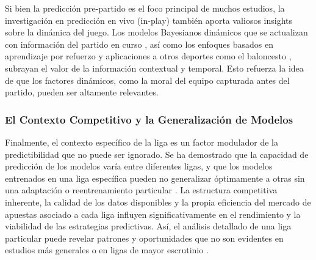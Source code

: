 Si bien la predicción pre-partido es el foco principal de muchos estudios, la investigación en predicción en vivo (in-play) también aporta valiosos insights sobre la dinámica del juego.
Los modelos Bayesianos dinámicos que se actualizan con información del partido en curso \cite{Zou2020BayesianInPlay}, así como los enfoques basados en aprendizaje por refuerzo \cite{Rahimian2024InGameRL} y aplicaciones a otros deportes como el baloncesto \cite{Song2020RealTimeNBAPredictions}, subrayan el valor de la información contextual y temporal. Esto refuerza la idea de que los factores dinámicos, como la moral del equipo capturada antes del partido, pueden ser altamente relevantes. \\


\subsubsection{El Contexto Competitivo y la Generalización de Modelos}

Finalmente, el contexto específico de la liga es un factor modulador de la predictibilidad que no puede ser ignorado.
Se ha demostrado que la capacidad de predicción de los modelos varía entre diferentes ligas, y que los modelos entrenados en una liga específica pueden no generalizar óptimamente a otras sin una adaptación o reentrenamiento particular \cite{Malamatinos2022GreekLeague}.
La estructura competitiva inherente, la calidad de los datos disponibles y la propia eficiencia del mercado de apuestas asociado a cada liga influyen significativamente en el rendimiento y la viabilidad de las estrategias predictivas. Así, el análisis detallado de una liga particular puede revelar patrones y oportunidades que no son evidentes en estudios más generales o en ligas de mayor escrutinio \cite{Beretta2023OptimalAlgorithmTournaments}.